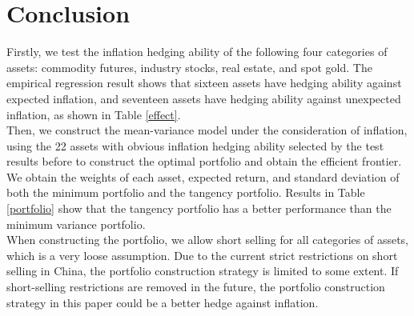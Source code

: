 \documentclass[12pt]{article}
\begin{document}
\newpage
\section{Conclusion}
Firstly, we test the inflation hedging ability of the following four categories of assets: commodity futures, industry stocks, real estate, and spot gold. The empirical regression result shows that sixteen assets have hedging ability against expected inflation, and seventeen assets have hedging ability against unexpected inflation, as shown in Table \ref{effect}.\\
Then, we construct the mean-variance model under the consideration of inflation, using the 22 assets with obvious inflation hedging ability selected by the test results before to construct the optimal portfolio and obtain the efficient frontier. We obtain the weights of each asset, expected return, and standard deviation of both the minimum portfolio and the tangency portfolio. Results in Table \ref{portfolio} show that the tangency portfolio has a better performance than the minimum variance portfolio.\\
When constructing the portfolio, we allow short selling for all categories of assets, which is a very loose assumption. Due to the current strict restrictions on short selling in China, the portfolio construction strategy is limited to some extent. If short-selling restrictions are removed in the future, the portfolio construction strategy in this paper could be a better hedge against inflation.\\
\newpage

\printbibliography
\end{document}
